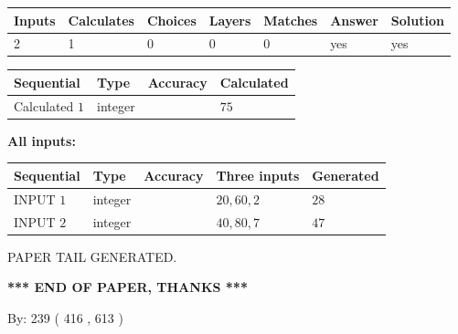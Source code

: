 \documentclass{ctexart}
\begin{document}
   
\noindent\begin{tabular}{|l|l|l|l|l|l|l|}
 \hline
Inputs & Calculates & Choices & Layers & Matches & Answer & Solution \\ \hline
 2  & 
 1  & 
 0
  & 
 0  & 
 0  & 
  yes & 
  yes 
  \\ \hline
 \end{tabular}
   
   
   
   
\noindent{}
   
   
  
  
\noindent\begin{tabular}{|l|l|l|l|}
\hline
 Sequential & Type & Accuracy & Calculated \\ 
\hline
 
 
  Calculated $  1 $ & integer &  & 
  $ 75 $ 
 \\  \hline  
 \end{tabular}
   
   
   
   
\noindent\vspace{0.1in}\hspace{-0.08in} {\textbf{\Large{All inputs: }}}
   
   
  
  
\noindent\begin{tabular}{|l|l|l|l|l|}
\hline
 Sequential & Type & Accuracy & Three inputs & Generated \\ 
\hline
 
 
  INPUT $  1 $ & integer &  & $
 20
 , 
 60
 , 
 2
 $ & $ 28 $ 
 \\  \hline  
 
 
  INPUT $  2 $ & integer &  & $
 40
 , 
 80
 , 
 7
 $ & $ 47 $ 
 \\  \hline  
 \end{tabular}
   
   
   
   
   
   
 \vspace{0.2in}
 
   
   
\vspace{2.0in} PAPER TAIL GENERATED.
   
   
   
   
\vspace{1.0in} 
{\textbf{\large{ *** END OF PAPER, THANKS *** }}} 
   
   
\hspace{1.0in} By: 
 239 ( 416 ,  613 )
   
\end{document}
